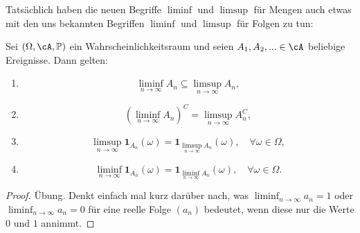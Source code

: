 Tats\"achlich haben die neuen Begriffe $\liminf$ und $\limsup$ f\"ur Mengen auch etwas mit den uns bekannten Begriffen $\liminf$ und $\limsup$ f\"ur Folgen zu tun:
\begin{lemma}
	Sei $(\Omega, \cA, \mathbb{P})$ ein Wahrscheinlichkeitsraum und seien $A_1,A_2,... \in \cA$ beliebige Ereignisse. Dann gelten:
	\begin{enumerate}[label=(\roman*)]
		\item \[ \liminf\limits_{n \to \infty} A_n \subseteq \limsup\limits_{n \to \infty} A_n, \]
		\item \[ (\liminf\limits_{n \to \infty} A_n)^C = \limsup\limits_{n \to \infty} A_n^C, \]
		\item \[ \limsup\limits_{n \to \infty} \mathbf{1}_{A_n}(\omega) = \mathbf{1}_{\limsup\limits_{n \to \infty} A_n}(\omega),\quad \forall \omega \in \Omega, \]
		\item \[ \liminf\limits_{n \to \infty} \mathbf{1}_{A_n}(\omega) = \mathbf{1}_{\liminf\limits_{n \to \infty} A_n}(\omega),\quad \forall \omega \in \Omega. \]
	\end{enumerate}
\end{lemma}

\begin{proof}
	Übung. Denkt einfach mal kurz dar\"uber nach, was $\liminf_{n\to\infty} a_n=1$ oder $\liminf_{n\to\infty} a_n=0$ f\"ur eine reelle Folge $(a_n)$ bedeutet, wenn diese nur die Werte $0$ und $1$ annimmt.
\end{proof}

